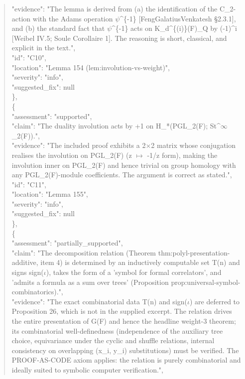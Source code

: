 \documentclass[11pt]{article}
\begin{document}
\begin{quote}
      "evidence": "The lemma is derived from (a) the identification of the C\_2-action with the Adams operation \ensuremath{\psi}\^{}\{-1\} [FengGalatiusVenkatesh §2.3.1], and (b) the standard fact that \ensuremath{\psi}\^{}\{-1\} acts on K\_d\^{}\{(i)\}(F)\_Q by (-1)\^{}i [Weibel IV.5; Soule Corollaire 1]. The reasoning is short, classical, and explicit in the text.",\\
      "id": "C10",\\
      "location": "Lemma 154 (lem:involution-vs-weight)",\\
      "severity": "info",\\
      "suggested\_fix": null\\
    \},\\
    \{\\
      "assessment": "supported",\\
      "claim": "The duality involution acts by +1 on H\_*(PGL\_2(F); St\^{}\ensuremath{\infty}\_2(F)).",\\
      "evidence": "The included proof exhibits a 2\ensuremath{\times}2 matrix whose conjugation realises the involution on PGL\_2(F) (z \ensuremath{\mapsto} -1/z form), making the involution inner on PGL\_2(F) and hence trivial on group homology with any PGL\_2(F)-module coefficients. The argument is correct as stated.",\\
      "id": "C11",\\
      "location": "Lemma 155",\\
      "severity": "info",\\
      "suggested\_fix": null\\
    \},\\
    \{\\
      "assessment": "partially\_supported",\\
      "claim": "The decomposition relation (Theorem thm:polyl-presentation-additive, item 4) is determined by an inductively computable set T(n) and signs sign(\ensuremath{\iota}), takes the form of a 'symbol for formal correlators', and 'admits a formula as a sum over trees' (Proposition prop:universal-symbol-combinatorics).",\\
      "evidence": "The exact combinatorial data T(n) and sign(\ensuremath{\iota}) are deferred to Proposition 26, which is not in the supplied excerpt. The relation drives the entire presentation of G(F) and hence the headline weight-3 theorem; its combinatorial well-definedness (independence of the auxiliary tree choice, equivariance under the cyclic and shuffle relations, internal consistency on overlapping (x\_i, y\_i) substitutions) must be verified. The PROOF-AS-CODE axiom applies: the relation is purely combinatorial and ideally suited to symbolic computer verification.",\\

\end{quote}
\end{document}
